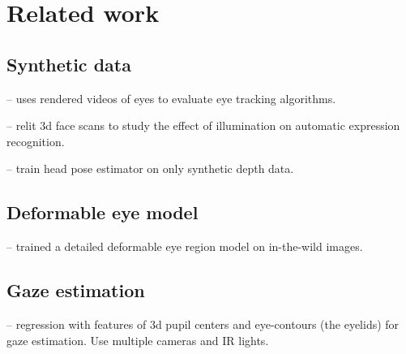 
\section{Related work}

\subsection{Synthetic data}

\cite{swirski2014rendering} -- uses rendered videos of eyes to evaluate eye tracking algorithms.

\cite{stratou2011effect} -- relit 3d face scans to study the effect of illumination on automatic expression recognition.

\cite{fanelli2011real} -- train head pose estimator on only synthetic depth data.

\subsection{Deformable eye model}

\cite{alabort2014statistically} -- trained a detailed deformable eye region model on in-the-wild images.

\subsection{Gaze estimation}

\cite{xiong2014gaze} -- regression with features of 3d pupil centers and eye-contours (the eyelids) for gaze estimation.  Use multiple cameras and IR lights.